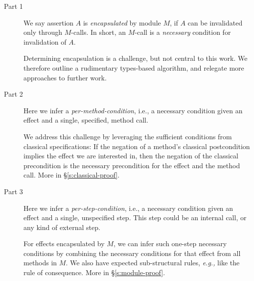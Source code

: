\begin{description}
\item[Part 1] 
We  say assertion $A$  is
\emph{encapsulated} by  module $M$, if  $A$ can be invalidated only through
  $M$-\internalC calls. In short, an $M$-\internalC call is a \emph{necessary} condition for
invalidation of $A$.

Determining encapsulation is a challenge, but not central to this work.
We therefore outline a rudimentary types-based algorithm, and relegate more
approaches to further work.
  
\item[Part 2]
 Here we infer a \emph{per-method-condition}, i.e., a 
 necessary condition given an effect and
a single, specified, method call. 
% 

We address this  challenge %
 by leveraging the sufficient conditions from classical specifications:
If the negation of a method's
 classical postcondition implies  the effect we are interested in, then the negation of the 
 classical precondition  is the necessary precondition for the effect and the method call.
More in \S\ref{s:classical-proof}.  



  
\item[Part 3]
Here we infer a \emph{per-step-condition}, i.e., a 
 necessary condition given an effect and
a single, unspecified step. This step could be an internal call, or any kind of external step.


For effects encapsulated by $M$, we can infer such one-step
necessary conditions by combining the necessary conditions for that effect from 
all   methods in $M$. We also have  expected sub-structural rules, \emph{e.g.,} 
 like the rule of consequence.
More in \S\ref{s:module-proof}.




\end{description}
